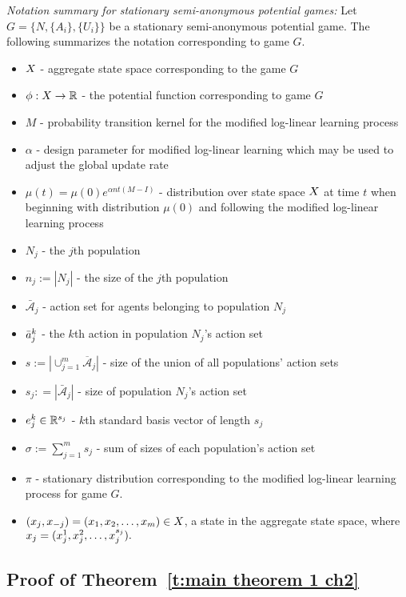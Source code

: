 \noindent\emph{Notation summary for stationary semi-anonymous potential games:}
Let $G = \{N,\{A_i\},\{U_i\}\}$ be a stationary semi-anonymous potential game. The following summarizes the notation corresponding to game $G.$
\begin{itemize}
\item $X$ - aggregate state space corresponding to the game $G$
\item $\phi: X\to \mathbb{R}$ - the potential function corresponding to game $G$
\item $M$ - probability transition kernel for the modified log-linear learning process
\item $\alpha$ - design parameter for modified log-linear learning which may be used to adjust the global update rate 
\item $\mu(t) = \mu(0)e^{\alpha nt(M-I)}$ - distribution over state space $X$ at time $t$ when beginning with distribution $\mu(0)$ and following the modified log-linear learning process
\item $N_j$ - the $j$th population
\item $n_j:= |N_j|$ - the size of the $j$th population
\item $\bar{\mathcal{A}}_j$ - action set for agents belonging to population $N_j$
\item $\bar{a}_j^k$ - the $k$th action in population $N_j$'s action set
\item $s:= |\cup_{j= 1}^m \overline{\mathcal{A}}_j|$  - size of the union of all populations' action sets
\item $s_j: = |\bar{\mathcal{A}}_j|$ - size of population $N_j$'s action set
\item $e_j^k\in \mathbb{R}^{s_j}$ - $k$th standard basis vector of length $s_j$
\item $\sigma:= \sum_{j = 1}^m s_j$ - sum of sizes of each population's action set
\item $\pi$ - stationary distribution corresponding to the modified log-linear learning process for game $G$.
\item $(x_{j},x_{-j}) = (x_{1},x_{2},\ldots,x_{m})\in X$, a state in the aggregate state space, where $x_{j} = (x_{j}^1,x_{j}^2,\ldots,x_{j}^{s_j}).$
\end{itemize}



\subsection{Proof of Theorem~\ref{t:main theorem 1 ch2}}\label{a:theorem 1 proof}


